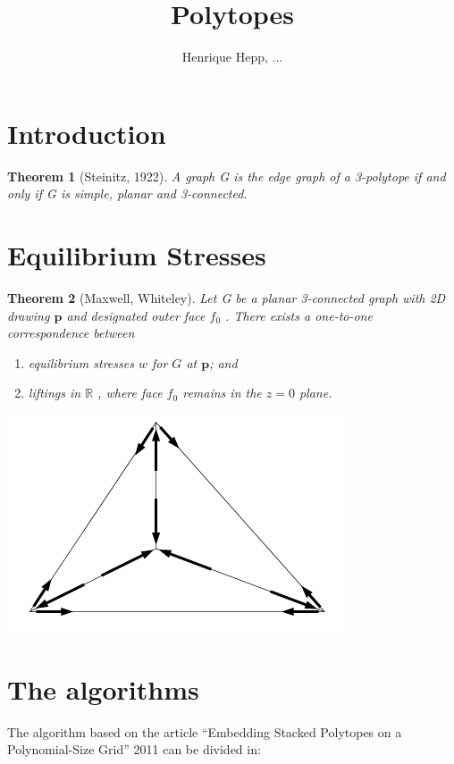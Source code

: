 \documentclass[10pt,a4paper]{article}
\title{Polytopes}
\author{Henrique Hepp, ...}
\newtheorem{thm}{Theorem}
\begin{document}
\maketitle

\section{Introduction}

\begin{thm}[Steinitz, 1922]
A graph G is the edge graph of a 3-polytope if
and only if G is simple, planar and 3-connected.
\end{thm}

\section{Equilibrium Stresses}

\begin{thm}[Maxwell, Whiteley]
Let G be a planar 3-connected graph with 2D drawing $\mathbf{p}$ and designated outer face $f_0$ . There exists a one-to-one correspondence between
\begin{enumerate}
\item equilibrium stresses $w$ for $G$ at $\mathbf{p}$; and
\item liftings in $\mathbb{R}$ , where face $f_0$ remains in the $z = 0$ plane.
\end{enumerate}

\end{thm}


\includegraphics[scale=0.8]{stresses.png} 

\section{The algorithms}

The algorithm based on the article ``Embedding Stacked Polytopes on a Polynomial-Size Grid'' 2011 can be divided in:
\end{document}
